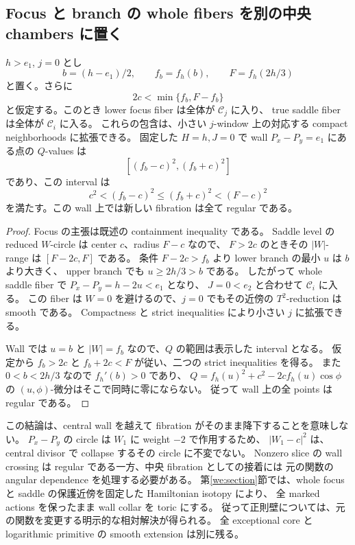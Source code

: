 \subsection{Focus と branch の whole fibers を別の中央 chambers に置く}

\begin{proposition}\label{tp:whole-chambers}

$h>e_1$, $j=0$ とし
\[
 b=(h-e_1)/2,\qquad f_b=f_h(b),\qquad
 F=f_h(2h/3)
\]
と置く。さらに
\[
 2c<\min\{f_b,F-f_b\}
\]
と仮定する。このとき lower focus fiber は全体が $\mathcal C_j$ に入り、
true saddle fiber は全体が $\mathcal C_i$ に入る。
これらの包含は、小さい $j$-window 上の対応する compact neighborhoods に拡張できる。
固定した $H=h,J=0$ で wall $P_x-P_y=e_1$ にある点の $Q$-values は
\[
 [(f_b-c)^2,(f_b+c)^2]
\]
であり、この interval は
\[
 c^2<(f_b-c)^2\le(f_b+c)^2<(F-c)^2
\]
を満たす。この wall 上では新しい fibration は全て regular である。
\end{proposition}

\begin{proof}
Focus の主張は既述の containment inequality である。
Saddle level の reduced $W$-circle は center $c$、radius $F-c$ なので、
$F>2c$ のときその $|W|$-range は $[F-2c,F]$ である。
条件 $F-2c>f_b$ より lower branch の最小 $u$ は $b$ より大きく、
upper branch でも $u\ge2h/3>b$ である。
したがって whole saddle fiber で $P_x-P_y=h-2u<e_1$ となり、
$J=0<e_2$ と合わせて $\mathcal C_i$ に入る。
この fiber は $W=0$ を避けるので、$j=0$ でもその近傍の $T^2$-reduction は smooth である。
Compactness と strict inequalities により小さい $j$ に拡張できる。

Wall では $u=b$ と $|W|=f_b$ なので、$Q$ の範囲は表示した interval となる。
仮定から $f_b>2c$ と $f_b+2c<F$ が従い、二つの strict inequalities を得る。
また $0<b<2h/3$ なので $f_h'(b)>0$ であり、
$Q=f_h(u)^2+c^2-2cf_h(u)\cos\phi$ の $(u,\phi)$-微分はそこで同時に零にならない。
従って wall 上の全 points は regular である。
\end{proof}

この結論は、central wall を越えて fibration がそのまま降下することを意味しない。
$P_x-P_y$ の circle は $W_1$ に weight $-2$ で作用するため、
$|W_1-c|^2$ は、central divisor で collapse するその circle に不変でない。
Nonzero slice の wall crossing は regular である一方、中央 fibration としての接着には
元の関数の angular dependence を処理する必要がある。
第\ref{we:section}節では、whole focus と saddle の保護近傍を固定した Hamiltonian isotopy により、
全 marked actions を保ったまま wall collar を toric にする。
従って正則壁については、元の関数を変更する明示的な相対解決が得られる。
全 exceptional core と logarithmic primitive の smooth extension は別に残る。

